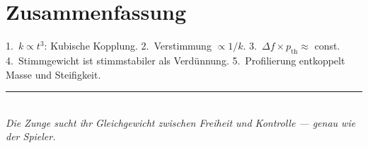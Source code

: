 \documentclass[11pt,a4paper]{article}
\begin{document}
\section{Zusammenfassung}
\begin{keybox}
1.~$k \propto t^3$: Kubische Kopplung. 2.~Verstimmung $\propto 1/k$. 3.~$\Delta f \times p_\text{th} \approx$ const. 4.~Stimmgewicht ist stimmstabiler als Verdünnung. 5.~Profilierung entkoppelt Masse und Steifigkeit.
\end{keybox}

\begin{center}
\textcolor{accentred}{\rule{0.6\textwidth}{1pt}}\\[4pt]
{\small\itshape Die Zunge sucht ihr Gleichgewicht zwischen Freiheit und Kontrolle --- genau wie der Spieler.}
\end{center}
\end{document}
